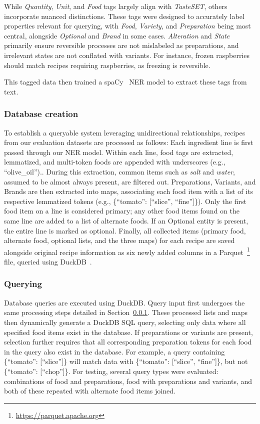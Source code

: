 \documentclass[11pt]{article}
\begin{document}
While \emph{Quantity}, \emph{Unit}, and \emph{Food} tags largely align with
\emph{TasteSET}, others incorporate nuanced distinctions.
These tags were designed to accurately label properties relevant for querying,
with \emph{Food}, \emph{Variety}, and \emph{Preparation} being most central,
alongside \emph{Optional} and \emph{Brand} in some cases.
\emph{Alteration} and \emph{State} primarily ensure reversible processes are not
mislabeled as preparations, and irrelevant states are not conflated with
variants.
For instance, frozen raspberries should match recipes requiring raspberries, as
freezing is reversible.

This tagged data then trained a spaCy~\cite{spacy} NER model to extract these tags from text.

\subsubsection{Database creation}\label{sec:dbStructure}
To establish a queryable system leveraging unidirectional relationships, recipes
from our evaluation datasets are processed as follows: Each ingredient line is
first passed through our NER model.
Within each line, food tags are extracted, lemmatized, and multi-token foods are
appended with underscores (e.g., ``olive\_oil'')..
During this extraction, common items such as \emph{salt} and \emph{water},
assumed to be almost always present, are filtered out.
Preparations, Variants, and Brands are then extracted into maps, associating
each food item with a list of its respective lemmatized tokens (e.g.,
\{``tomato'': [``slice'', ``fine'']\}).
Only the first food item on a line is considered primary; any other food items
found on the same line are added to a list of alternate foods.
If an Optional entity is present, the entire line is marked as optional.
Finally, all collected items (primary food, alternate food, optional lists, and
the three maps) for each recipe are saved alongside original recipe information
as six newly added columns in a
Parquet~\footnote{\url{https://parquet.apache.org}} file, queried using
DuckDB~\cite{duckdb}.

\subsubsection{Querying}
Database queries are executed using DuckDB\@.
Query input first undergoes the same processing steps detailed in
Section~\ref{sec:dbStructure}.
These processed lists and maps then dynamically generate a DuckDB SQL query,
selecting only data where all specified food items exist in the database.
If preparations or variants are present, selection further requires that all
corresponding preparation tokens for each food in the query also exist in the
database.
For example, a query containing \{``tomato'': [``slice'']\} will match data with
\{``tomato'': [``slice'', ``fine'']\}, but not \{``tomato'': [``chop'']\}.
For testing, several query types were evaluated: combinations of food and
preparations, food with preparations and variants, and both of these repeated
with alternate food items joined.
\end{document}
